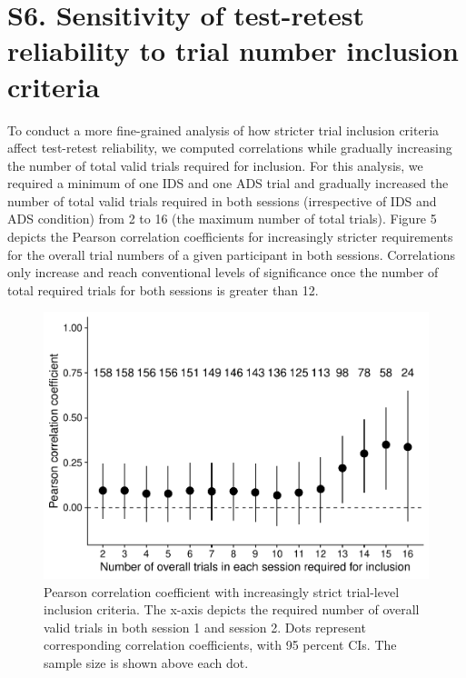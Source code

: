 \documentclass[
  man, donotrepeattitle,floatsintext]{apa6}
\begin{document}
\newpage

\hypertarget{s6.-sensitivity-of-test-retest-reliability-to-trial-number-inclusion-criteria}{%
\section{S6. Sensitivity of test-retest reliability to trial number inclusion criteria}\label{s6.-sensitivity-of-test-retest-reliability-to-trial-number-inclusion-criteria}}

To conduct a more fine-grained analysis of how stricter trial inclusion criteria affect test-retest reliability, we computed correlations while gradually increasing the number of total valid trials required for inclusion.
For this analysis, we required a minimum of one IDS and one ADS trial and gradually increased the number of total valid trials required in both sessions (irrespective of IDS and ADS condition) from 2 to 16 (the maximum number of total trials).
Figure 5 depicts the Pearson correlation coefficients for increasingly stricter requirements for the overall trial numbers of a given participant in both sessions.
Correlations only increase and reach conventional levels of significance once the number of total required trials for both sessions is greater than 12.

\begin{figure}
\centering
\includegraphics{MB1T_supplement_files/figure-latex/sfig5-1.pdf}
\caption{\label{fig:sfig5}Pearson correlation coefficient with increasingly strict trial-level inclusion criteria. The x-axis depicts the required number of overall valid trials in both session 1 and session 2. Dots represent corresponding correlation coefficients, with 95 percent CIs. The sample size is shown above each dot.}
\end{figure}
\end{document}
